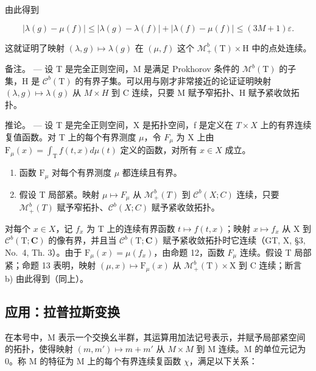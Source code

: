 由此得到

\[
\left| \lambda (g) - \mu (f) \right| \leqslant \left| \lambda (g) - \lambda (f) \right| + \left| \lambda (f) - \mu (f) \right| \leqslant (3 M + 1) \varepsilon .
\]

这就证明了映射 \((\lambda, g) \mapsto \lambda(g)\) 在 \((\mu, f)\) 这个 \(\mathcal{M}_+^b(\mathrm{T}) \times \mathrm{H}\) 中的点处连续。

备注。 --- 设 T 是完全正则空间，M 是满足 Prokhorov 条件的 \(\mathcal{M}^{b}(\mathrm{T})\) 的子集，H 是 \(\mathcal{C}^{b}(\mathrm{T})\) 的有界子集。可以用与刚才非常接近的论证证明映射 \((\lambda,g)\mapsto\lambda(g)\) 从 \(M\times H\) 到 C 连续，只要 M 赋予窄拓扑、H 赋予紧收敛拓扑。

推论。 --- 设 T 是完全正则空间，X 是拓扑空间，f 是定义在 \(T \times X\) 上的有界连续复值函数。对 T 上的每个有界测度 \(\mu\)，令 \(F_{\mu}\) 为 X 上由 \(\mathrm{F}_{\mu}(x) = \int_{\mathrm{T}} f(t, x) d\mu(t)\) 定义的函数，对所有 \(x \in X\) 成立。

\begin{enumerate}
\def\labelenumi{\alph{enumi})}
\item
  函数 \(\mathrm{F}_{\mu}\) 对每个有界测度 \(\mu\) 都连续且有界。
\item
  假设 T 局部紧。映射 \(\mu\mapsto F_{\mu}\) 从 \(\mathcal{M}_{+}^{b}(T)\) 到 \(\mathcal{C}^{b}(X;C)\) 连续，只要 \(\mathcal{M}_{+}^{b}(T)\) 赋予窄拓扑、\(\mathcal{C}^{b}(X;C)\) 赋予紧收敛拓扑。
\end{enumerate}

对每个 \(x \in X\)，记 \(f_{x}\) 为 T 上的连续有界函数 \(t \mapsto f(t, x)\)；映射 \(x \mapsto f_{x}\) 从 X 到 \(\mathcal{C}^{b}(\mathrm{T}; \mathbf{C})\) 的像有界，并且当 \(\mathcal{C}^{b}(\mathrm{T}; \mathbf{C})\) 赋予紧收敛拓扑时它连续（GT, X, §3, No.~4, Th. 3）。由于 \(\mathrm{F}_{\mu}(x) = \mu(f_{x})\)，由命题 12，函数 \(F_{\mu}\) 连续。假设 T 局部紧；命题 13 表明，映射 \((\mu, x) \mapsto \mathrm{F}_{\mu}(x)\) 从 \(\mathcal{M}_{+}^{b}(\mathrm{T}) \times \mathrm{X}\) 到 C 连续；断言 b) 由此得到（同上）。

\subsection{应用：拉普拉斯变换}

在本号中，M 表示一个交换幺半群，其运算用加法记号表示，并赋予局部紧空间的拓扑，使得映射 \((m, m') \mapsto m + m'\) 从 \(M \times M\) 到 M 连续。M 的单位元记为 0。称 M 的特征为 M 上的每个有界连续复函数 \(\chi\)，满足以下关系：

